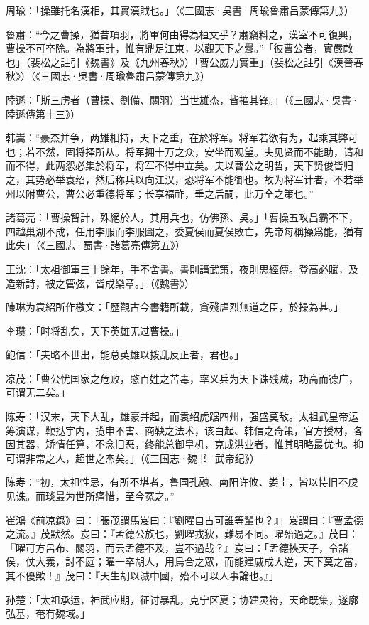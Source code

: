周瑜：「操雖托名漢相，其實漢賊也。」（《三國志·吳書·周瑜魯肅吕蒙傳第九》）

魯肅：“今之曹操，猶昔項羽，將軍何由得為桓文乎？肅竊料之，漢室不可復興，曹操不可卒除。為將軍計，惟有鼎足江東，以觀天下之釁。”「彼曹公者，實嚴敵也」（裴松之註引《魏書》及《九州春秋》）「曹公威力實重」（裴松之註引《漢晉春秋》）（《三國志·吳書·周瑜魯肅吕蒙傳第九》）

陸遜：「斯三虏者（曹操、劉備、關羽）当世雄杰，皆摧其锋。」（《三國志·吳書·陸遜傳第十三》）

韩嵩：“豪杰并争，两雄相持，天下之重，在於将军。将军若欲有为，起乘其弊可也；若不然，固将择所从。将军拥十万之众，安坐而观望。夫见贤而不能助，请和而不得，此两怨必集於将军，将军不得中立矣。夫以曹公之明哲，天下贤俊皆归之，其势必举袁绍，然后称兵以向江汉，恐将军不能御也。故为将军计者，不若举州以附曹公，曹公必重德将军；长享福祚，垂之后嗣，此万全之策也。”

諸葛亮：「曹操智計，殊絕於人，其用兵也，仿佛孫、吳。」「曹操五攻昌霸不下，四越巢湖不成，任用李服而李服圖之，委夏侯而夏侯敗亡，先帝每稱操爲能，猶有此失」（《三國志·蜀書·諸葛亮傳第五》）

王沈：「太祖御軍三十餘年，手不舍書。書則講武策，夜則思經傳。登高必賦，及造新詩，被之管弦，皆成樂章。」（《魏書》）

陳琳为袁紹所作檄文：「歷觀古今書籍所載，貪殘虐烈無道之臣，於操為甚。」

李瓒：「时将乱矣，天下英雄无过曹操。」

鲍信：「夫略不世出，能总英雄以拨乱反正者，君也。」

凉茂：「曹公忧国家之危败，愍百姓之苦毒，率义兵为天下诛残贼，功高而德广，可谓无二矣。」

陈寿：「汉末，天下大乱，雄豪并起，而袁绍虎踞四州，强盛莫敌。太祖武皇帝运筹演谋，鞭挞宇内，揽申不害、商鞅之法术，该白起、韩信之奇策，官方授材，各因其器，矫情任算，不念旧恶，终能总御皇机，克成洪业者，惟其明略最优也。抑可谓非常之人，超世之杰矣。」（《三国志·魏书·武帝纪》）

陈寿：“初，太祖性忌，有所不堪者，鲁国孔融、南阳许攸、娄圭，皆以恃旧不虔见诛。而琰最为世所痛惜，至今冤之。”

崔鴻《前凉錄》曰：「張茂謂馬岌曰：『劉曜自古可誰等輩也？』」岌謂曰：『曹孟德之流。』茂默然。岌曰：『孟德公族也，劉曜戎狄，難易不同。曜殆過之。』茂曰：『曜可方呂布、關羽，而云孟德不及，豈不過哉？』岌曰：「孟德挾天子，令諸侯，仗大義，討不庭；曜一卒胡人，用烏合之眾，而能建威成大逆，天下莫之當，其不優歟！』茂曰：『天生胡以滅中國，殆不可以人事論也。』」

孙楚：「太祖承运，神武应期，征讨暴乱，克宁区夏；协建灵符，天命既集，遂廓弘基，奄有魏域。」

